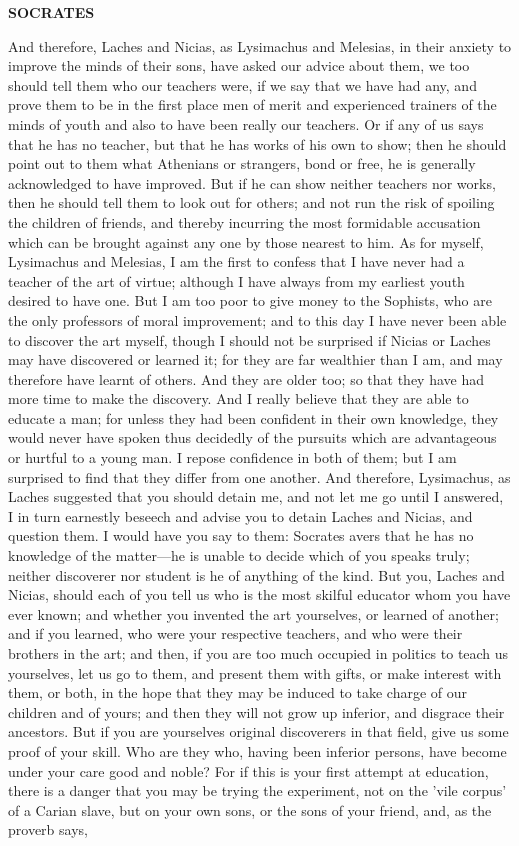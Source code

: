\documentclass[11pt,letter]{book}
\begin{document}
\par \textbf{SOCRATES}
\par   And therefore, Laches and Nicias, as Lysimachus and Melesias, in their anxiety to improve the minds of their sons, have asked our advice about them, we too should tell them who our teachers were, if we say that we have had any, and prove them to be in the first place men of merit and experienced trainers of the minds of youth and also to have been really our teachers. Or if any of us says that he has no teacher, but that he has works of his own to show; then he should point out to them what Athenians or strangers, bond or free, he is generally acknowledged to have improved. But if he can show neither teachers nor works, then he should tell them to look out for others; and not run the risk of spoiling the children of friends, and thereby incurring the most formidable accusation which can be brought against any one by those nearest to him. As for myself, Lysimachus and Melesias, I am the first to confess that I have never had a teacher of the art of virtue; although I have always from my earliest youth desired to have one. But I am too poor to give money to the Sophists, who are the only professors of moral improvement; and to this day I have never been able to discover the art myself, though I should not be surprised if Nicias or Laches may have discovered or learned it; for they are far wealthier than I am, and may therefore have learnt of others. And they are older too; so that they have had more time to make the discovery. And I really believe that they are able to educate a man; for unless they had been confident in their own knowledge, they would never have spoken thus decidedly of the pursuits which are advantageous or hurtful to a young man. I repose confidence in both of them; but I am surprised to find that they differ from one another. And therefore, Lysimachus, as Laches suggested that you should detain me, and not let me go until I answered, I in turn earnestly beseech and advise you to detain Laches and Nicias, and question them. I would have you say to them:  Socrates avers that he has no knowledge of the matter—he is unable to decide which of you speaks truly; neither discoverer nor student is he of anything of the kind. But you, Laches and Nicias, should each of you tell us who is the most skilful educator whom you have ever known; and whether you invented the art yourselves, or learned of another; and if you learned, who were your respective teachers, and who were their brothers in the art; and then, if you are too much occupied in politics to teach us yourselves, let us go to them, and present them with gifts, or make interest with them, or both, in the hope that they may be induced to take charge of our children and of yours; and then they will not grow up inferior, and disgrace their ancestors. But if you are yourselves original discoverers in that field, give us some proof of your skill. Who are they who, having been inferior persons, have become under your care good and noble? For if this is your first attempt at education, there is a danger that you may be trying the experiment, not on the 'vile corpus' of a Carian slave, but on your own sons, or the sons of your friend, and, as the proverb says, 
\end{document}
